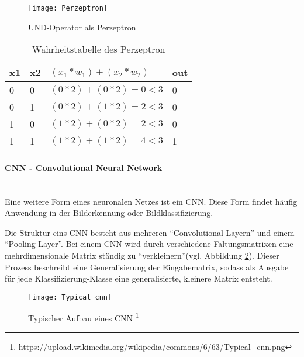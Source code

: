     \begin{figure}[H]
        \centering
        \texttt{[image: Perzeptron]}
        \caption{UND-Operator als Perzeptron \cite{DrawIO}}
        \label{fig:PerzeptronAND}
    \end{figure}

    \begin{table}[H]
        \centering
        \begin{tabular}{|l|l|l|l|}
            \hline
            x1 & x2 & \( (x_1 * w_1) + (x_2 * w_2) \) & out \\
            \hline
            0 & 0 & \( (0 * 2) + (0 * 2) = 0 < 3 \) & 0 \\
            \hline
            0 & 1 & \( (0 * 2) + (1 * 2) = 2 < 3 \) & 0 \\
            \hline
            1 & 0 & \( (1 * 2) + (0 * 2) = 2 < 3 \) & 0 \\
            \hline
            1 & 1 & \( (1 * 2) + (1 * 2) = 4 < 3 \) & 1 \\
            \hline
        \end{tabular}
        \caption{Wahrheitstabelle des Perzeptron}
        \label{tabl:Perzeptron}
    \end{table}

    \paragraph{CNN - Convolutional Neural Network}
    \cite[Vgl. im Folgenden]{Robotics2}\\
    Eine weitere Form eines neuronalen Netzes ist ein \ac{CNN}.
    Diese Form findet häufig Anwendung in der Bilderkennung oder Bildklassifizierung.
    \newline

    Die Struktur eins \ac{CNN} besteht aus mehreren "`Convolutional Layern"' und einem "`Pooling Layer"'.
    Bei einem \ac{CNN} wird durch verschiedene Faltungsmatrixen eine mehrdimensionale Matrix ständig zu "`verkleinern"'(vgl. Abbildung \ref{fig:Typisch_CNN}).
    Dieser Prozess beschreibt eine Generalisierung der Eingabematrix, sodass als Ausgabe für jede Klassifizierung-Klasse eine generalisierte, kleinere Matrix entsteht.

    \begin{figure}[H]
        \centering
        \texttt{[image: Typical\_cnn]}
        \caption[Typischer Aufbau eines CNN]{Typischer Aufbau eines \ac{CNN} \footnote{\url{https://upload.wikimedia.org/wikipedia/commons/6/63/Typical_cnn.png}} }
        \label{fig:Typisch_CNN}
    \end{figure}



